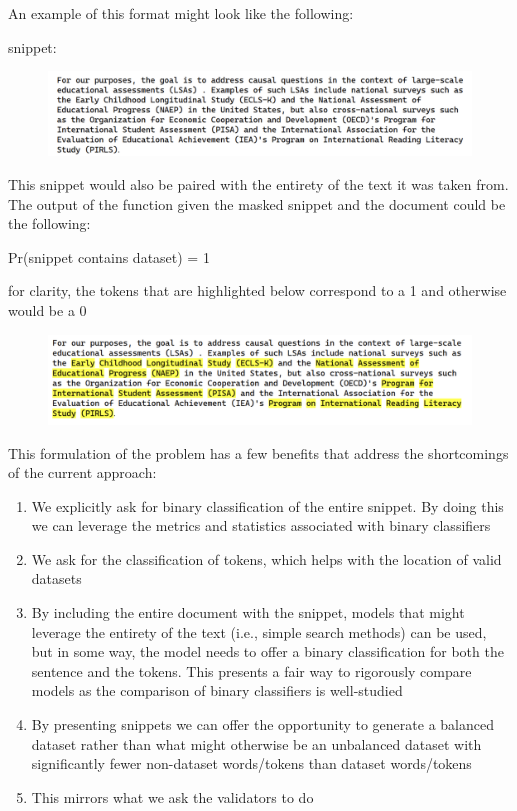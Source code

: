 \documentclass[titlepage, 11pt]{article}
\begin{document}
{An example of this format might look like the following: 

snippet:

\begin{figure}[h!]
\centering
  \includegraphics[scale=0.45]{snippet1.png}
  \vspace{-2.5ex}
  \caption*{}
    \vspace{-0.97ex}
  \label{fig:snippet1}
\end{figure}

This snippet would also be paired with the entirety of the text it was taken from.
The output of the function given the masked snippet and the document could be the following:

Pr(snippet contains dataset) = 1

for clarity, the tokens that are highlighted below correspond to a 1 and otherwise would be a 0

\begin{figure}[h!]
\centering
  \includegraphics[scale=0.45]{snippet2.png}
  \vspace{-2.5ex}
  \caption*{}
    \vspace{-0.97ex}
  \label{fig:snippet2}
\end{figure}

This formulation of the problem has a few benefits that address the shortcomings of the current approach:

\begin{enumerate}[label=\arabic*.]
    \item We explicitly ask for binary classification of the entire snippet. By doing this we can leverage the metrics and statistics associated with binary classifiers
    \item We ask for the classification of tokens, which helps with the location of valid datasets
    \item By including the entire document with the snippet, models that might leverage the entirety of the text (i.e., simple search methods) can be used, but in some way, the model needs to offer a binary classification for both the sentence and the tokens. This presents a fair way to rigorously compare models as the comparison of binary classifiers is well-studied
    \item By presenting snippets we can offer the opportunity to generate a balanced dataset rather than what might otherwise be an unbalanced dataset with significantly fewer non-dataset words/tokens than dataset words/tokens
    \item This mirrors what we ask the validators to do
\end{enumerate}

}
\end{document}
